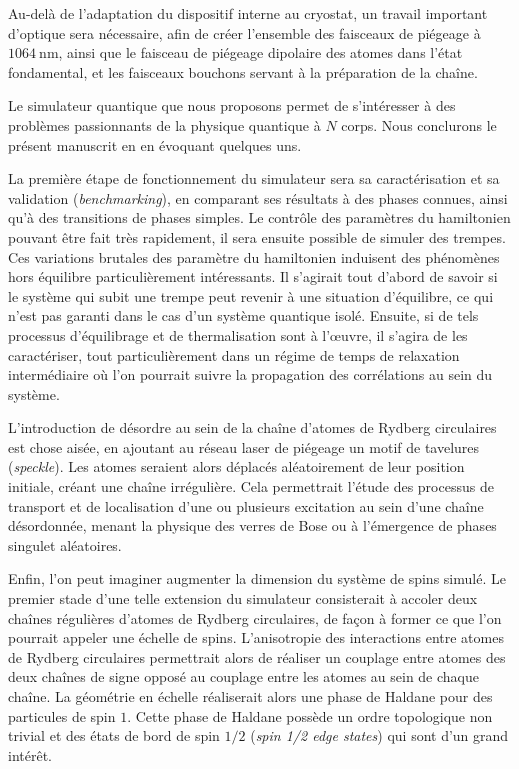 Au-delà de l'adaptation du dispositif interne au cryostat, un travail important d'optique sera nécessaire, afin de créer l'ensemble des faisceaux de piégeage à $\SI{1064}{\nano\meter}$, ainsi que le faisceau de piégeage dipolaire des atomes dans l'état fondamental, et les faisceaux \og bouchons \fg{} servant à la préparation de la chaîne.

\bigskip
Le simulateur quantique que nous proposons permet de s'intéresser à des problèmes passionnants de la physique quantique à $N$ corps.
Nous conclurons le présent manuscrit en en évoquant quelques uns.

La première étape de fonctionnement du simulateur sera sa caractérisation et sa validation (\textit{benchmarking}), en comparant ses résultats à des phases connues, ainsi qu'à des transitions de phases simples.
Le contrôle des paramètres du hamiltonien pouvant être fait très rapidement, il sera ensuite possible de simuler des trempes.
Ces variations brutales des paramètre du hamiltonien induisent des phénomènes hors équilibre particulièrement intéressants.
Il s'agirait tout d'abord de savoir si le système qui subit une trempe peut revenir à une situation d'équilibre, ce qui n'est pas garanti dans le cas d'un système quantique isolé.
Ensuite, si de tels processus d'équilibrage et de thermalisation sont à l'\oe uvre, il s'agira de les caractériser, tout particulièrement dans un régime de temps de relaxation intermédiaire où l'on pourrait suivre la propagation des corrélations au sein du système.

L'introduction de désordre au sein de la chaîne d'atomes de Rydberg circulaires est chose aisée, en ajoutant au réseau laser de piégeage un motif de tavelures (\textit{speckle}).
Les atomes seraient alors déplacés aléatoirement de leur position initiale, créant une chaîne irrégulière.
Cela permettrait l'étude des processus de transport et de localisation d'une ou plusieurs excitation au sein d'une chaîne désordonnée, menant la physique des verres de Bose ou à l'émergence de phases singulet aléatoires.

Enfin, l'on peut imaginer augmenter la dimension du système de spins simulé.
Le premier stade d'une telle extension du simulateur consisterait à accoler deux chaînes régulières d'atomes de Rydberg circulaires, de façon à former ce que l'on pourrait appeler une \og échelle \fg{} de spins.
L'anisotropie des interactions entre atomes de Rydberg circulaires permettrait alors de réaliser un couplage entre atomes des deux chaînes de signe opposé au couplage entre les atomes au sein de chaque chaîne.
La géométrie en échelle réaliserait alors une phase de Haldane pour des particules de spin $1$.
Cette phase de Haldane possède un ordre topologique non trivial et des états de bord de spin $1/2$ (\textit{spin 1/2 edge states}) qui sont d'un grand intérêt.

